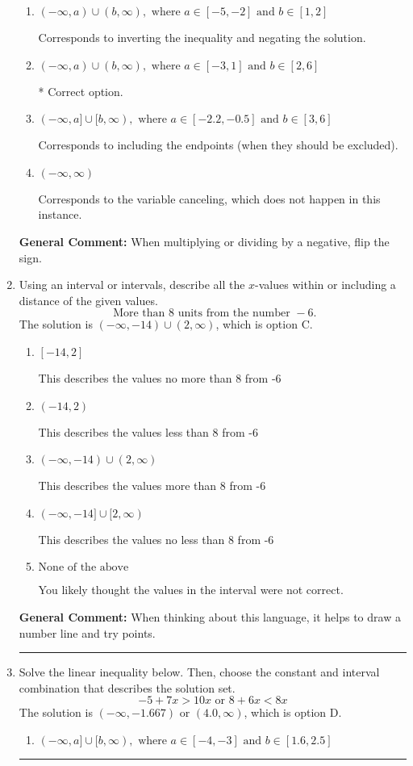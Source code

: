 \documentclass{extbook}[14pt]
\newcommand{\litem}[1]{\item #1

\rule{\textwidth}{0.4pt}}
\begin{document}
\begin{enumerate}
{\begin{enumerate}[label=\Alph*.]
Corresponds to including the endpoints AND negating.
\item \( (-\infty, a) \cup (b, \infty), \text{ where } a \in [-5, -2] \text{ and } b \in [1, 2] \)

Corresponds to inverting the inequality and negating the solution.
\item \( (-\infty, a) \cup (b, \infty), \text{ where } a \in [-3, 1] \text{ and } b \in [2, 6] \)

 * Correct option.
\item \( (-\infty, a] \cup [b, \infty), \text{ where } a \in [-2.2, -0.5] \text{ and } b \in [3, 6] \)

Corresponds to including the endpoints (when they should be excluded).
\item \( (-\infty, \infty) \)

Corresponds to the variable canceling, which does not happen in this instance.
\end{enumerate}

\textbf{General Comment:} When multiplying or dividing by a negative, flip the sign.
}
\litem{
Using an interval or intervals, describe all the $x$-values within or including a distance of the given values.
\[ \text{ More than } 8 \text{ units from the number } -6. \]
The solution is \( (-\infty, -14) \cup (2, \infty) \), which is option C.\begin{enumerate}[label=\Alph*.]
\item \( [-14, 2] \)

This describes the values no more than 8 from -6
\item \( (-14, 2) \)

This describes the values less than 8 from -6
\item \( (-\infty, -14) \cup (2, \infty) \)

This describes the values more than 8 from -6
\item \( (-\infty, -14] \cup [2, \infty) \)

This describes the values no less than 8 from -6
\item \( \text{None of the above} \)

You likely thought the values in the interval were not correct.
\end{enumerate}

\textbf{General Comment:} When thinking about this language, it helps to draw a number line and try points.
}
\litem{
Solve the linear inequality below. Then, choose the constant and interval combination that describes the solution set.
\[ -5 + 7 x > 10 x \text{ or } 8 + 6 x < 8 x \]
The solution is \( (-\infty, -1.667) \text{ or } (4.0, \infty) \), which is option D.\begin{enumerate}[label=\Alph*.]
\item \( (-\infty, a] \cup [b, \infty), \text{ where } a \in [-4, -3] \text{ and } b \in [1.6, 2.5] \)


\end{enumerate}}
\end{enumerate}
\end{document}
